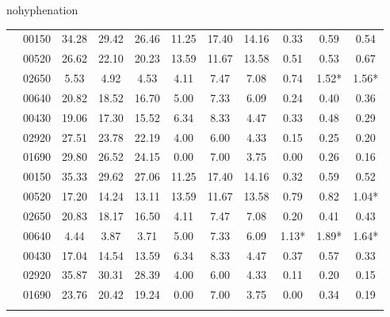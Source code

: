 \begin{hyphenrules}{nohyphenation}
\begin{table}[H]
{\begin{tabular}{>{\raggedleft\arraybackslash}p{4cm} lccCccCccc}
             & 00150 & 34.28 & 29.42 & 26.46 & 11.25 & 17.40 & 14.16 & 0.33 & 0.59 & 0.54 \\
            & 00520 &                       26.62 & 22.10 & 20.23 &     13.59 & 11.67 & 13.58 & 0.51 & 0.53 & 0.67 \\
            & 02650 &                       5.53 & 4.92 & 4.53 &        4.11 & 7.47 & 7.08 &    0.74 & 1.52* & 1.56* \\
            & 00640 &                       20.82 & 18.52 & 16.70 &     5.00 & 7.33 & 6.09 &    0.24 & 0.40 & 0.36 \\
            & 00430 &                       19.06 & 17.30 & 15.52 &     6.34 & 8.33 & 4.47 &    0.33 & 0.48 & 0.29 \\
            & 02920 &                       27.51 & 23.78 & 22.19 &     4.00 & 6.00 & 4.33 &    0.15 & 0.25 & 0.20 \\
            & 01690 &                       29.80 & 26.52 & 24.15 &     0.00 & 7.00 & 3.75 &    0.00 & 0.26 & 0.16 \\
            \midrule
            
             & 00150 & 35.33 & 29.62 & 27.06 & 11.25 & 17.40 & 14.16 & 0.32 & 0.59 & 0.52 \\
            & 00520 &                       17.20 & 14.24 & 13.11 &     13.59 & 11.67 & 13.58 & 0.79 & 0.82 & 1.04* \\
            & 02650 &                       20.83 & 18.17 & 16.50 &     4.11 & 7.47 & 7.08 &    0.20 & 0.41 & 0.43 \\
            & 00640 &                       4.44 & 3.87 & 3.71 &        5.00 & 7.33 & 6.09 &    1.13* & 1.89* & 1.64* \\
            & 00430 &                       17.04 & 14.54 & 13.59 &     6.34 & 8.33 & 4.47 &    0.37 & 0.57 & 0.33 \\
            & 02920 &                       35.87 & 30.31 & 28.39 &     4.00 & 6.00 & 4.33 &    0.11 & 0.20 & 0.15 \\
            & 01690 &                       23.76 & 20.42 & 19.24 &     0.00 & 7.00 & 3.75 &    0.00 & 0.34 & 0.19 \\
            \midrule
            

\end{tabular}}
\end{table}
\end{hyphenrules}
